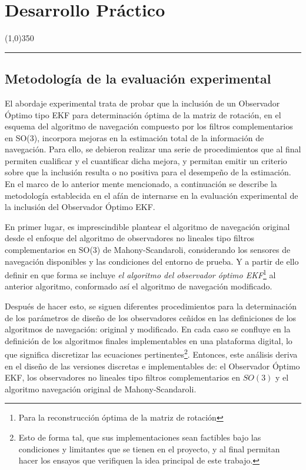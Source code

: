 \documentclass[10pt]{report}
\numberwithin{equation}{chapter}
\numberwithin{algorithm}{chapter}
\begin{document}
\chapter{Desarrollo Práctico}
\begin{center}
\line(1,0){350}\\
\rule[-.4\baselineskip]{1.0\linewidth}{3.2pt}
\end{center}
\section{Metodología de la evaluación experimental}\label{Metodologia}
El abordaje experimental trata de probar que la inclusión de un Observador Óptimo tipo EKF para determinación óptima de la matriz de rotación, en el esquema del algoritmo de navegación compuesto por los filtros complementarios en SO(3), incorpora mejoras en la estimación total de la información de navegación. Para ello, se debieron realizar una serie de procedimientos que al final permiten cualificar y el cuantificar dicha mejora, y permitan emitir un criterio sobre que la inclusión resulta o no positiva para el desempeño de la estimación. En el marco de lo anterior mente mencionado, a continuación se describe la metodología establecida en el afán de internarse en la evaluación experimental de la inclusión del Observador Óptimo EKF.\par
En primer lugar, es imprescindible plantear el algoritmo de navegación original desde el enfoque del algoritmo de observadores no lineales tipo filtros complementarios en SO(3) de Mahony-Scandaroli, considerando los sensores de navegación disponibles y las condiciones del entorno de prueba. Y a partir de ello definir en que forma se incluye \emph{el algoritmo del observador óptimo EKF}\footnote{Para la reconstrucción óptima de la matriz de rotación} al anterior algoritmo, conformado así el algoritmo de navegación modificado.\par
Después de hacer esto, se siguen diferentes procedimientos para la determinación de los parámetros de diseño de los observadores ceñidos en las definiciones de los algoritmos de navegación: original y modificado. En cada caso se confluye en la definición de los algoritmos finales implementables en una plataforma digital, lo que significa discretizar las ecuaciones pertinentes\footnote{ Esto de forma tal, que sus implementaciones sean factibles bajo las condiciones y limitantes que se tienen en el proyecto, y al final permitan hacer los ensayos que verifiquen la idea principal de este trabajo.}. Entonces, este análisis deriva en el diseño de las versiones discretas e implementables de: el Observador Óptimo EKF, los observadores no lineales tipo filtros complementarios en $SO(3)$ y el algoritmo navegación original de Mahony-Scandaroli.\par
\end{document}
